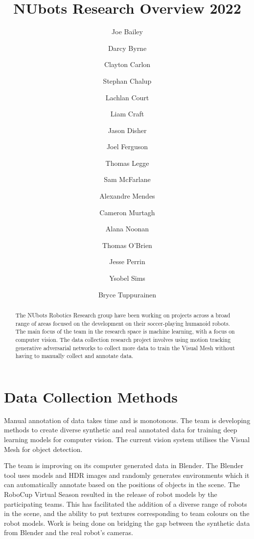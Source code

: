 \documentclass[runningheads]{llncs}
\begin{document}
%
\title{NUbots Research Overview 2022}
%
%
\author{Joe Bailey \and Darcy Byrne \and Clayton Carlon \and Stephan Chalup \and Lachlan Court \and Liam Craft \and
    Jason Disher \and Joel Ferguson \and Thomas Legge \and Sam McFarlane \and Alexandre Mendes \and Cameron Murtagh \and Alana Noonan \and Thomas O'Brien \and Jesse Perrin \and Ysobel Sims \and Bryce Tuppurainen}
%
%
\maketitle              %
%
\begin{abstract}
The NUbots Robotics Research group have been working on projects across a broad range of areas focused on the development on their soccer-playing humanoid robots. The main focus of the team in the research space is machine learning, with a focus on computer vision. The data collection research project involves using motion tracking generative adversarial networks to collect more data to train the Visual Mesh without having to manually collect and annotate data. 
\end{abstract}
%
%
\section*{Data Collection Methods}
Manual annotation of data takes time and is monotonous. The team is developing methods to create diverse synthetic and real annotated data for training deep learning models for computer vision. The current vision system utilises the Visual Mesh for object detection.

The team is improving on its computer generated data in Blender. The Blender tool \cite{nubotsNUpbrGit} uses models and HDR images and randomly generates environments which it can automatically annotate based on the positions of objects in the scene. The RoboCup Virtual Season resulted in the release of robot models by the participating teams. This has facilitated the addition of a diverse range of robots in the scene, and the ability to put textures corresponding to team colours on the robot models. Work is being done on bridging the gap between the synthetic data from Blender and the real robot's cameras.
\end{document}
